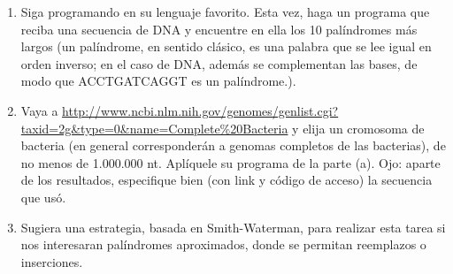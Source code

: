 \begin{enumerate}
\item Siga programando en su lenguaje favorito. Esta vez, haga un programa que reciba una
secuencia de DNA y encuentre en ella los 10 palíndromes más largos (un palíndrome, en
sentido clásico, es una palabra que se lee igual en orden inverso; en el caso de DNA, además se
complementan las bases, de modo que ACCTGATCAGGT es un palíndrome.).


\item Vaya a \url{http://www.ncbi.nlm.nih.gov/genomes/genlist.cgi?taxid=2g\&type=0\&name=Complete\%20Bacteria} y elija un cromosoma de bacteria (en general corresponderán a genomas
completos de las bacterias), de no menos de 1.000.000 nt. Aplíquele su programa de la parte (a).
Ojo: aparte de los resultados, especifique bien (con link y código de acceso) la secuencia que
usó.

\item Sugiera una estrategia, basada en Smith-Waterman, para realizar esta tarea si nos interesaran
palíndromes aproximados, donde se permitan reemplazos o inserciones.


\end{enumerate}
